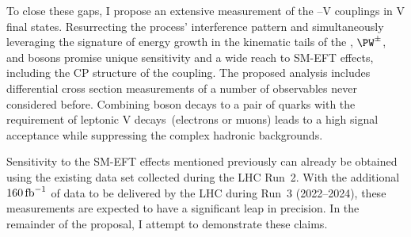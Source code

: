 \documentclass[a4paper,11pt]{article}
\newcommand{\Pb}{{{\Pqb}}\xspace}
\newcommand{\PAb}{{{{\Paqb}}}\xspace}
\renewcommand{\PV}{{{{V}}}\xspace}
\newcommand{\VH}{{{\PV}{\PH}}\xspace}
\begin{document}
To close these gaps, I propose an extensive measurement of the \PH--\PV couplings in \VH final states. 
Resurrecting the process' interference pattern and simultaneously leveraging the signature of energy growth in the kinematic tails of the \PH, $\PW^{\pm}$, and \PZ bosons promise unique sensitivity and a wide reach to SM-EFT effects, including the CP structure of the coupling.
The proposed analysis includes differential cross section measurements of a number of observables never considered before.
Combining \PH boson decays to a pair of \Pb quarks with the requirement of leptonic \PV decays~(electrons or muons) leads to a high signal acceptance while suppressing the complex hadronic backgrounds.  




Sensitivity to the SM-EFT effects mentioned previously can already be obtained using the existing data set collected during the LHC Run~2. 
With the additional $160\mbox{\ensuremath{\,\text{fb}^{-1}}}$ of data to be delivered by the LHC during Run~3 (2022--2024), these measurements are expected to have a significant leap in precision. 
In the remainder of the proposal, I attempt to demonstrate these claims.
\end{document}
